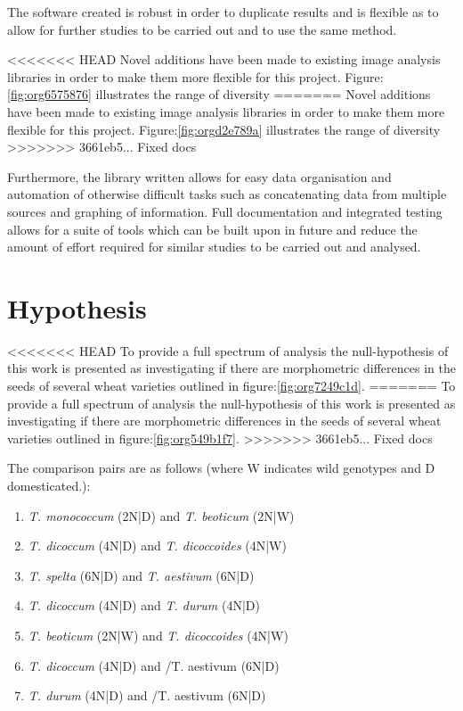 \documentclass[11pt]{report}
\begin{document}
The software created is robust in order to duplicate results and is flexible as to allow for further studies to be carried out and to use the same method.

<<<<<<< HEAD
Novel additions have been made to existing image analysis libraries in order to make them more flexible for this project. Figure:\ref{fig:org6575876} illustrates the range of diversity
=======
Novel additions have been made to existing image analysis libraries in order to make them more flexible for this project. Figure:\ref{fig:orgd2e789a} illustrates the range of diversity
>>>>>>> 3661eb5... Fixed docs

Furthermore, the library written allows for easy data organisation and automation of otherwise difficult tasks such as concatenating data from multiple sources and graphing of information. Full documentation and integrated testing allows for a suite of tools which can be built upon in future and reduce the amount of effort required for similar studies to be carried out and analysed.

\section{Hypothesis}
<<<<<<< HEAD
\label{sec:orgd50dc21}
To provide a full spectrum of analysis the null-hypothesis of this work is presented as investigating if there are morphometric differences in the seeds of several wheat varieties outlined in figure:\ref{fig:org7249c1d}.
=======
\label{sec:org4a38633}
To provide a full spectrum of analysis the null-hypothesis of this work is presented as investigating if there are morphometric differences in the seeds of several wheat varieties outlined in figure:\ref{fig:org549b1f7}.
>>>>>>> 3661eb5... Fixed docs

The comparison pairs are as follows (where W indicates wild genotypes and D domesticated.):

\begin{enumerate}
\item \emph{T. monococcum} (2N|D) and \emph{T. beoticum} (2N|W)
\item \emph{T. dicoccum} (4N|D) and \emph{T. dicoccoides} (4N|W)
\item \emph{T. spelta} (6N|D) and \emph{T. aestivum} (6N|D)
\item \emph{T. dicoccum} (4N|D) and \emph{T. durum} (4N|D)
\item \emph{T. beoticum} (2N|W) and \emph{T. dicoccoides} (4N|W)
\item \emph{T. dicoccum} (4N|D) and /T. aestivum (6N|D)
\item \emph{T. durum} (4N|D) and /T. aestivum (6N|D)
\end{enumerate}
\end{document}
